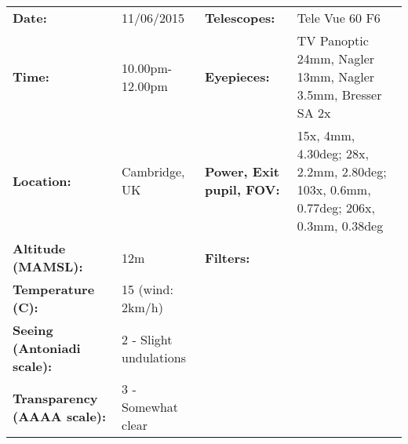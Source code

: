 \begin{tabular}{ p{1.7in} p{1.2in} p{1.5in} p{4.2in}}
{\bf Date:} & 11/06/2015 & {\bf Telescopes:} & Tele Vue 60 F6 \\ 
{\bf Time:} & 10.00pm-12.00pm & {\bf Eyepieces:} & TV Panoptic 24mm, Nagler 13mm, Nagler 3.5mm, Bresser SA 2x \\ 
{\bf Location:} & Cambridge, UK & {\bf Power, Exit pupil, FOV:} & 15x, 4mm, 4.30deg; 28x, 2.2mm, 2.80deg; 103x, 0.6mm, 0.77deg; 206x, 0.3mm, 0.38deg \\ 
{\bf Altitude (MAMSL):} & 12m & {\bf Filters:} &  \\ 
{\bf Temperature (C):} & 15 (wind: 2km/h) & & \\ 
{\bf Seeing (Antoniadi scale):} & 2 - Slight undulations & & \\ 
{\bf Transparency (AAAA scale):} & 3 - Somewhat clear & & \\ 
\end{tabular}
\centering 
